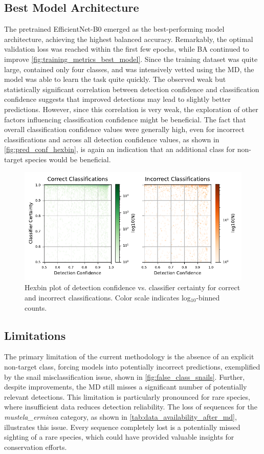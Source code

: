 \subsection{Best Model Architecture}
The pretrained EfficientNet-B0 emerged as the best-performing model architecture, achieving the highest balanced accuracy.
Remarkably, the optimal validation loss was reached within the first few epochs, while \ac{BA} continued to improve \autoref{fig:training_metrics_best_model}.
Since the training dataset was quite large, contained only four classes, and was intensively vetted using the \ac{MD}, the model was able to learn the task quite quickly.
The observed weak but statistically significant correlation between detection confidence and classification confidence suggests that improved detections may lead to slightly better predictions.
However, since this correlation is very weak, the exploration of other factors influencing classification confidence might be beneficial.
The fact that overall classification confidence values were generally high, even for incorrect classifications and across all detection confidence values, as shown in \autoref{fig:pred_conf_hexbin}, is again an indication that an additional class for non-target species would be beneficial.

\begin{figure}[ht]
\centering
\includegraphics{figures/pred_conf_hexbin.pdf}
\caption{Hexbin plot of detection confidence vs. classifier certainty for correct and incorrect classifications. Color scale indicates log$_{10}$-binned counts.}
\label{fig:pred_conf_hexbin}
\end{figure}

\subsection{Limitations}
The primary limitation of the current methodology is the absence of an explicit non-target class, forcing models into potentially incorrect predictions, exemplified by the snail misclassification issue, shown in \autoref{fig:false_class_snails}.
Further, despite improvements, the \ac{MD} still misses a significant number of potentially relevant detections.
This limitation is particularly pronounced for rare species, where insufficient data reduces detection reliability.
The loss of sequences for the \textit{mustela\_erminea} category, as shown in \autoref{tab:data_availability_after_md}, illustrates this issue.
Every sequence completely lost is a potentially missed sighting of a rare species, which could have provided valuable insights for conservation efforts.

